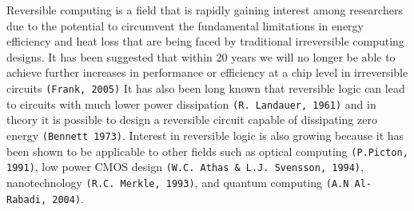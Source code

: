 Reversible computing is a field that is rapidly gaining interest among researchers due 
to the potential to circumvent the fundamental limitations in energy efficiency and heat 
loss that are being faced by traditional irreversible computing designs. It has been 
suggested that within 20 years we will no longer be able to achieve further increases in 
performance or efficiency at a chip level in irreversible circuits \verb!(Frank, 2005)! It has 
also been long known that reversible logic can lead to circuits with much lower power 
dissipation \verb!(R. Landauer, 1961)! and in theory it is possible to design a reversible 
circuit capable of dissipating zero energy \verb!(Bennett 1973)!. Interest in reversible logic 
is also growing because it has been shown to be applicable to other fields such as 
optical computing \verb!(P.Picton, 1991)!, low power CMOS design \verb!(W.C. Athas & L.J. Svensson, 1994)!, 
nanotechnology \verb!(R.C. Merkle, 1993)!, and quantum computing \verb!(A.N Al-Rabadi, 2004)!.
